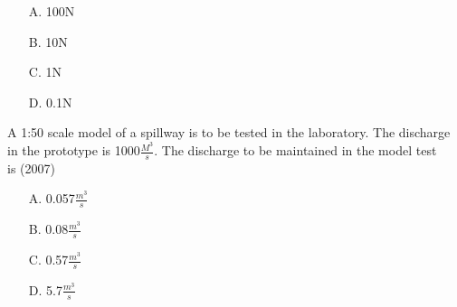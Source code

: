   \begin{enumerate}
    \item [A.] 100N
    \item [B.] 10N 
    \item [C.] 1N 
    \item [D.] 0.1N 
  \end{enumerate}
  \item  A 1:50 scale model of a spillway is to be tested in the laboratory. The discharge in
  the prototype is 1000$\frac{M^3}{s}$. The discharge to be maintained in the model test \\ is \hfill (2007) 
  \begin{enumerate}
    \item [A.] 0.057$\frac{m^3}{s}$ 
    \item [B.] 0.08$\frac{m^3}{s}$
    \item [C.] 0.57$\frac{m^3}{s}$ 
    \item [D.] 5.7$\frac{m^3}{s}$
  \end{enumerate}

